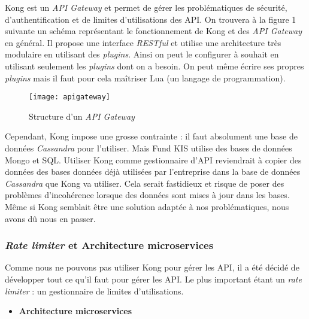 \vspace{3mm}

Kong est un \textit{API Gateway} et permet de gérer les problématiques de sécurité, d'authentification et de limites d'utilisations des API. On trouvera à la figure 1 suivante un schéma représentant le fonctionnement de Kong et des \textit{API Gateway} en général. Il propose une interface \textit{RESTful} et utilise une architecture très modulaire en utilisant des \textit{plugins}. Ainsi on peut le configurer à souhait en utilisant seulement les \textit{plugins} dont on a besoin. On peut même écrire ses propres \textit{plugins} mais il faut pour cela maîtriser Lua (un langage de programmation).

\begin{figure}[!h]
\centering
\texttt{[image: apigateway]}
\caption{Structure d'un \textit{API Gateway}}
\end{figure}

\vspace{3mm}

Cependant, Kong impose une grosse contrainte : il faut absolument une base de données \textit{Cassandra} pour l'utiliser. Mais Fund KIS utilise des bases de données Mongo et SQL. Utiliser Kong comme gestionnaire d'API reviendrait à copier des données des bases données déjà utilisées par l'entreprise dans la base de données \textit{Cassandra} que Kong va utiliser. Cela serait fastidieux et risque de poser des problèmes d'incohérence lorsque des données sont mises à jour dans les bases. Même si Kong semblait être une solution adaptée à nos problématiques, nous avons dû nous en passer.



\subsubsection{\textit{Rate limiter} et Architecture microservices}
Comme nous ne pouvons pas utiliser Kong pour gérer les API, il a été décidé de développer tout ce qu'il faut pour gérer les API. Le plus important étant un \textit{rate limiter} : un gestionnaire de limites d'utilisations.

\vspace{3mm}

\begin{itemize}[font=\color{blue}, label=]
  \item \textbf{  Architecture microservices}
\end{itemize}

